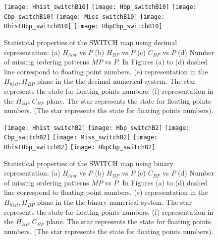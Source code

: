 \begin{figure}
	\texttt{[image: Hhist\_switchB10]}
	\texttt{[image: Hbp\_switchB10]}
	\texttt{[image: Cbp\_switchB10]}
	\texttt{[image: Miss\_switchB10]}
	\texttt{[image: HhistHbp\_switchB10]}
	\texttt{[image: HbpCbp\_switchB10]}
	\caption{Statistical properties of the SWITCH map using decimal representation: (a) $H_{hist}$ vs $P$ (b) $H_{BP}$ vs $P$ (c) $C_{BP}$ vs $P$ (d) Number of missing ordering patterns $MP$ vs $P$. In Figures (a) to (d) dashed line correspond to floating point numbers. (e) representation in the $H_{hist},H_{BP}$ plane in the the decimal numerical system.  The star represents the state for floating points numbers. (f) representation in the $H_{BP},C_{BP}$ plane.  The star represents the state for floating points numbers. (The star represents the state for floating points numbers). } \label{fig:seqdec}
\end{figure}

\begin{figure}
	\texttt{[image: Hhist\_switchB2]}
	\texttt{[image: Hbp\_switchB2]}
	\texttt{[image: Cbp\_switchB2]}
	\texttt{[image: Miss\_switchB2]}
	\texttt{[image: HhistHbp\_switchB2]}
	\texttt{[image: HbpCbp\_switchB2]}
	\caption{Statistical properties of the SWITCH map using binary representation: (a) $H_{hist}$ vs $P$ (b) $H_{BP}$ vs $P$ (c) $C_{BP}$ vs $P$ (d) Number of missing ordering patterns $MP$ vs $P$. In Figures (a) to (d) dashed line correspond to floating point numbers. (e) representation in the $H_{hist},H_{BP}$ plane in the the binary numerical system.  The star represents the state for floating points numbers. (f) representation in the $H_{BP},C_{BP}$ plane.  The star represents the state for floating points numbers. (The star represents the state for floating points numbers). } \label{fig:seqbin}
\end{figure}

